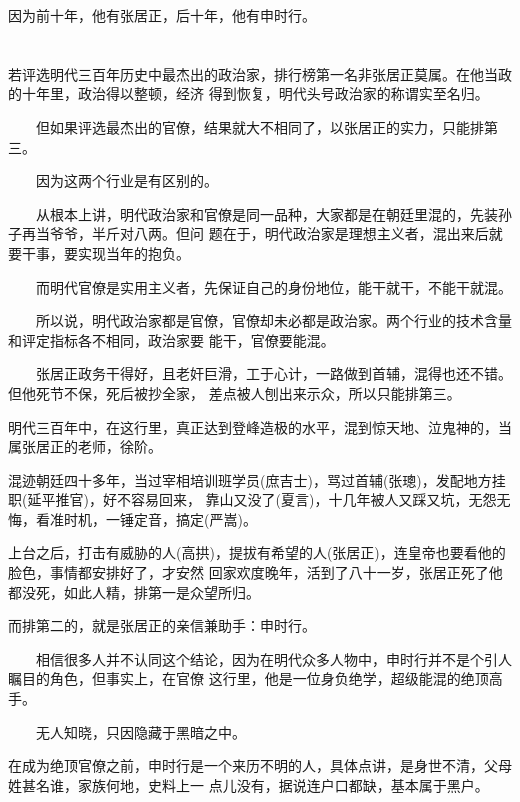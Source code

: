 \documentclass[11pt,a4paper,onecolumn]{article}
\begin{document}
因为前十年，他有张居正，后十年，他有申时行。

\section[\thesection]{}

若评选明代三百年历史中最杰出的政治家，排行榜第一名非张居正莫属。在他当政的十年里，政治得以整顿，经济
得到恢复，明代头号政治家的称谓实至名归。

　　但如果评选最杰出的官僚，结果就大不相同了，以张居正的实力，只能排第三。

　　因为这两个行业是有区别的。

　　从根本上讲，明代政治家和官僚是同一品种，大家都是在朝廷里混的，先装孙子再当爷爷，半斤对八两。但问
题在于，明代政治家是理想主义者，混出来后就要干事，要实现当年的抱负。

　　而明代官僚是实用主义者，先保证自己的身份地位，能干就干，不能干就混。

　　所以说，明代政治家都是官僚，官僚却未必都是政治家。两个行业的技术含量和评定指标各不相同，政治家要
能干，官僚要能混。

　　张居正政务干得好，且老奸巨滑，工于心计，一路做到首辅，混得也还不错。但他死节不保，死后被抄全家，
差点被人刨出来示众，所以只能排第三。

明代三百年中，在这行里，真正达到登峰造极的水平，混到惊天地、泣鬼神的，当属张居正的老师，徐阶。

混迹朝廷四十多年，当过宰相培训班学员(庶吉士)，骂过首辅(张璁)，发配地方挂职(延平推官)，好不容易回来，
靠山又没了(夏言)，十几年被人又踩又坑，无怨无悔，看准时机，一锤定音，搞定(严嵩)。

上台之后，打击有威胁的人(高拱)，提拔有希望的人(张居正)，连皇帝也要看他的脸色，事情都安排好了，才安然
回家欢度晚年，活到了八十一岁，张居正死了他都没死，如此人精，排第一是众望所归。

而排第二的，就是张居正的亲信兼助手：申时行。

　　相信很多人并不认同这个结论，因为在明代众多人物中，申时行并不是个引人瞩目的角色，但事实上，在官僚
这行里，他是一位身负绝学，超级能混的绝顶高手。

　　无人知晓，只因隐藏于黑暗之中。

在成为绝顶官僚之前，申时行是一个来历不明的人，具体点讲，是身世不清，父母姓甚名谁，家族何地，史料上一
点儿没有，据说连户口都缺，基本属于黑户。

\section[\thesection]{}
\end{document}
